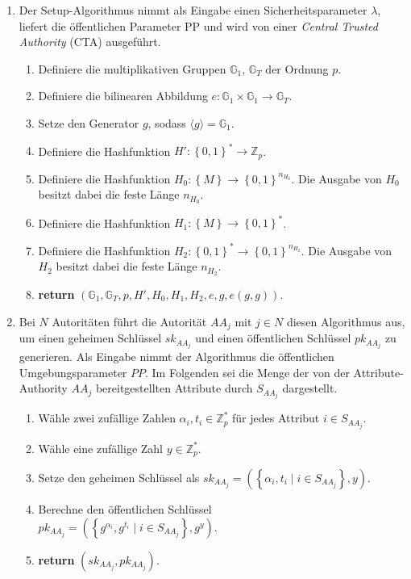 \begin{enumerate}
	\item {} Der
		Setup-Algorithmus nimmt als Eingabe einen Sicherheitsparameter $\lambda$,
		liefert die öffentlichen Parameter $\text{PP}$ und wird von einer
		\textit{Central Trusted Authority} (CTA) ausgeführt.
		\begin{enumerate}
			\item Definiere die multiplikativen Gruppen $\mathbb{G}_1$,
				$\mathbb{G}_T$ der Ordnung $p$.
			\item Definiere die bilinearen Abbildung $e: \mathbb{G}_1 \times
				\mathbb{G}_1 \to \mathbb{G}_T$.
			\item Setze den Generator $g$, sodass $\langle g \rangle = \mathbb{G}_1$.
			\item Definiere die Hashfunktion $H' : \left\{ 0,1 \right\}^* \to
				\mathbb{Z}_p$.
			\item Definiere die Hashfunktion $H_0 : \left\{ M \right\} \to \left\{ 0,1
				\right\}^{n_{H_0}}$. Die Ausgabe von $H_0$ besitzt dabei die feste Länge
				$n_{H_0}$.
			\item Definiere die Hashfunktion $H_1 : \left\{ M \right\} \to
				\left\{ 0,1 \right\}^*$.
			\item Definiere die Hashfunktion $H_2 : \left\{ 0,1 \right\}^* \to \left\{
				0,1 \right\}^{n_{H_2}}$. Die Ausgabe von $H_2$ besitzt dabei die feste
				Länge $n_{H_2}$.
			\item \textbf{return} $\left( \mathbb{G}_1, \mathbb{G}_T, p, H', H_0, H_1,
				H_2, e, g, e(g, g)\right)$.
		\end{enumerate}

	\item {} Bei $N$
		Autoritäten führt die Autorität $AA_j$ mit $j \in N$ diesen Algorithmus
		aus, um einen geheimen Schlüssel $sk_{AA_j}$ und einen öffentlichen
		Schlüssel $pk_{AA_j}$ zu generieren. Als Eingabe nimmt der Algorithmus die
		öffentlichen Umgebungsparameter $PP$. Im Folgenden sei die Menge der von der
		Attribute-Authority $AA_j$ bereitgestellten Attribute durch $S_{AA_j}$
		dargestellt.
		\begin{enumerate}
			\item Wähle zwei zufällige Zahlen $\alpha_i, t_i \in \mathbb{Z}^*_p$ für
				jedes Attribut $i \in S_{AA_j}$.
			\item Wähle eine zufällige Zahl $y \in \mathbb{Z}^*_p$.
			\item Setze den geheimen Schlüssel als $sk_{AA_j} = \left(
				\left\{\alpha_i, t_i \;\vert\; i \in S_{AA_j}\right\}, y \right)$.
			\item Berechne den öffentlichen Schlüssel \\
				$pk_{AA_j} = \left( \left\{ g^{\alpha_i}, g^{t_i} \;\vert\; i \in
				S_{AA_j} \right\}, g^y \right)$.
			\item \textbf{return} $\left( sk_{AA_j}, pk_{AA_j} \right)$.
		\end{enumerate}


\end{enumerate}
